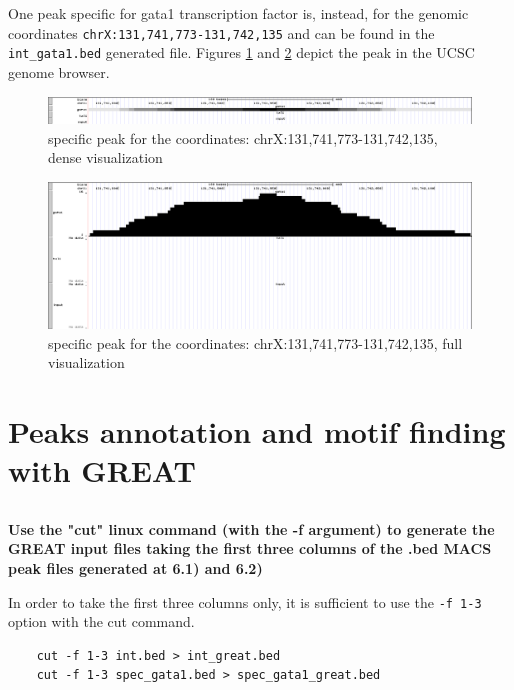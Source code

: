 \documentclass[12pt, a4paper]{article}
\begin{document}
	One peak specific for gata1 transcription factor is, instead, for the genomic coordinates \verb|chrX:131,741,773-131,742,135| and can be found in the \verb|int_gata1.bed| generated file. Figures \ref{fig:browser_spec_dense} and \ref{fig:browser_spec_full} depict the peak in the UCSC genome browser. 

	\begin{figure}[h]
		\centering
		\includegraphics[width = 1.15\textwidth, height = .08\textheight]{browser_spec_dense}
		\caption{specific peak for the coordinates: chrX:131,741,773-131,742,135, dense visualization}
		\label{fig:browser_spec_dense}
	\end{figure}
	
	\clearpage
	
	\begin{figure}[t]
		\centering
		\includegraphics[width = 1.15\textwidth]{browser_spec_full}
		\caption{specific peak for the coordinates: chrX:131,741,773-131,742,135, full visualization}
		\label{fig:browser_spec_full}
	\end{figure}
	
	\section{Peaks annotation and motif finding with GREAT}
	
	\subsection{}
	\textbf{Use the "cut" linux command (with the -f argument) to generate the GREAT input files taking the first three columns of the .bed MACS peak files generated at 6.1) and 6.2)}
	
	In order to take the first three columns only, it is sufficient to use the \verb|-f 1-3| option with the cut command.
	
	\begin{verbatim}
	cut -f 1-3 int.bed > int_great.bed
	cut -f 1-3 spec_gata1.bed > spec_gata1_great.bed
	\end{verbatim}
	
\end{document}
